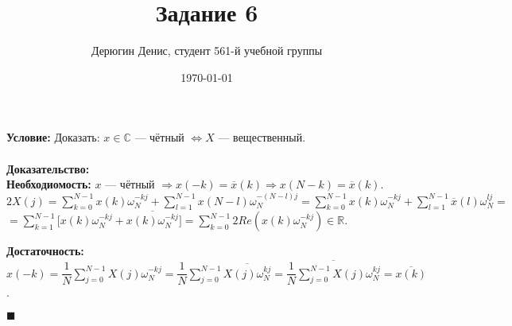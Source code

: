 \documentclass{article}
\title{Задание 6}
\author{
	Дерюгин Денис, студент 561-й учебной группы
}
\date{\today}
\newcommand\proofend{\begin{flushright}$\blacksquare$\end{flushright}}
\begin{document}
\maketitle
\large{
	\textbf{Условие:} Доказать: $x \in \mathbb{C}$ --- чётный $\Leftrightarrow X$ --- вещественный.\\
	\\
	\textbf{Доказательство:} \\
	\textbf{Необходиомость:} $x$ --- чётный $\Rightarrow x(-k) = \overline{x}(k) \Rightarrow x(N - k) = \overline{x}(k)$.\\
	$2X(j) = \sum\limits_{k = 0}^{N - 1} x(k) \omega_N^{-kj} + \sum\limits_{l = 1}^{N - 1} x(N - l) \omega_N^{-(N - l)j} = \sum\limits_{k = 0}^{N - 1} x(k) \omega_N^{-kj} + \sum\limits_{l = 1}^{N - 1} \overline{x}(l) \omega_N^{lj} = $\\
	$= \sum\limits_{k = 1}^{N - 1} \bigg [ x(k) \omega_N^{-kj} + \overline{x(k) \omega_N^{-kj}} \bigg ] = \sum\limits_{k = 0}^{N - 1} 2Re(x(k) \omega_N^{-kj}) \in \mathbb{R}$.

	\textbf{Достаточность:} $x(-k) = \dfrac{1}{N} \sum\limits_{j = 0}^{N - 1} X(j) \omega_N^{-kj} = \dfrac{1}{N} \sum\limits_{j = 0}^{N - 1} \overline{X(j) \omega_N^{kj}} = \overline{\dfrac{1}{N} \sum\limits_{j = 0}^{N - 1} X(j) \omega_N^{kj}} = \overline{x(k)}$.

	\proofend
}
\end{document}
